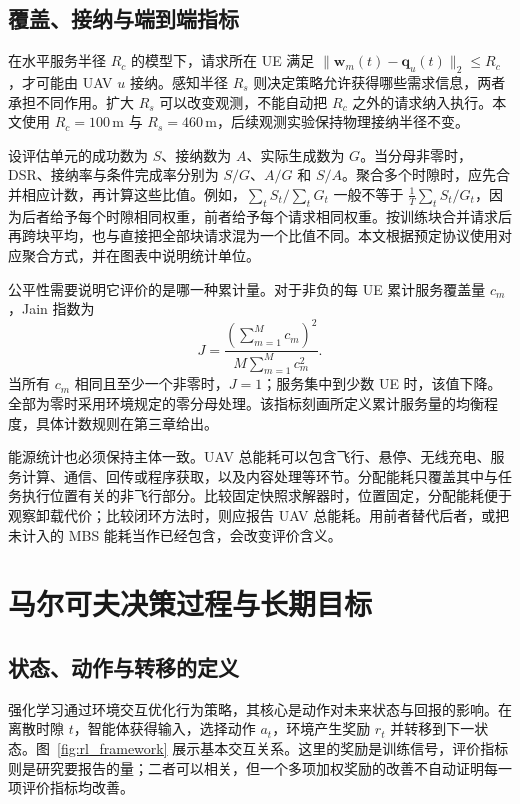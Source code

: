 \subsection{覆盖、接纳与端到端指标}
\label{sec:ch2-service-metrics}

在水平服务半径 $R_c$ 的模型下，请求所在 UE 满足 $\|\mathbf w_m(t)-\mathbf q_u(t)\|_2\leq R_c$，才可能由 UAV $u$ 接纳。感知半径 $R_s$ 则决定策略允许获得哪些需求信息，两者承担不同作用。扩大 $R_s$ 可以改变观测，不能自动把 $R_c$ 之外的请求纳入执行。本文使用 $R_c=100\,\mathrm{m}$ 与 $R_s=460\,\mathrm{m}$，后续观测实验保持物理接纳半径不变。

设评估单元的成功数为 $S$、接纳数为 $A$、实际生成数为 $G$。当分母非零时，DSR、接纳率与条件完成率分别为 $S/G$、$A/G$ 和 $S/A$。聚合多个时隙时，应先合并相应计数，再计算这些比值。例如，$\sum_t S_t/\sum_t G_t$ 一般不等于 $\frac{1}{T}\sum_t S_t/G_t$，因为后者给予每个时隙相同权重，前者给予每个请求相同权重。按训练块合并请求后再跨块平均，也与直接把全部块请求混为一个比值不同。本文根据预定协议使用对应聚合方式，并在图表中说明统计单位。

公平性需要说明它评价的是哪一种累计量。对于非负的每 UE 累计服务覆盖量 $c_m$，Jain 指数为
\begin{equation}
    J=\frac{\left(\sum_{m=1}^{M}c_m\right)^2}
    {M\sum_{m=1}^{M}c_m^2}.
    \label{eq:ch2-jain}
\end{equation}
当所有 $c_m$ 相同且至少一个非零时，$J=1$；服务集中到少数 UE 时，该值下降。全部为零时采用环境规定的零分母处理。该指标刻画所定义累计服务量的均衡程度，具体计数规则在第三章给出。

能源统计也必须保持主体一致。UAV 总能耗可以包含飞行、悬停、无线充电、服务计算、通信、回传或程序获取，以及内容处理等环节。分配能耗只覆盖其中与任务执行位置有关的非飞行部分。比较固定快照求解器时，位置固定，分配能耗便于观察卸载代价；比较闭环方法时，则应报告 UAV 总能耗。用前者替代后者，或把未计入的 MBS 能耗当作已经包含，会改变评价含义。

\section{马尔可夫决策过程与长期目标}
\label{sec:ch2-mdp}

\subsection{状态、动作与转移的定义}
\label{subsec:rl}

强化学习通过环境交互优化行为策略，其核心是动作对未来状态与回报的影响\cite{sutton2018reinforcement}。在离散时隙 $t$，智能体获得输入，选择动作 $a_t$，环境产生奖励 $r_t$ 并转移到下一状态。图~\ref{fig:rl_framework} 展示基本交互关系。这里的奖励是训练信号，评价指标则是研究要报告的量；二者可以相关，但一个多项加权奖励的改善不自动证明每一项评价指标均改善。

